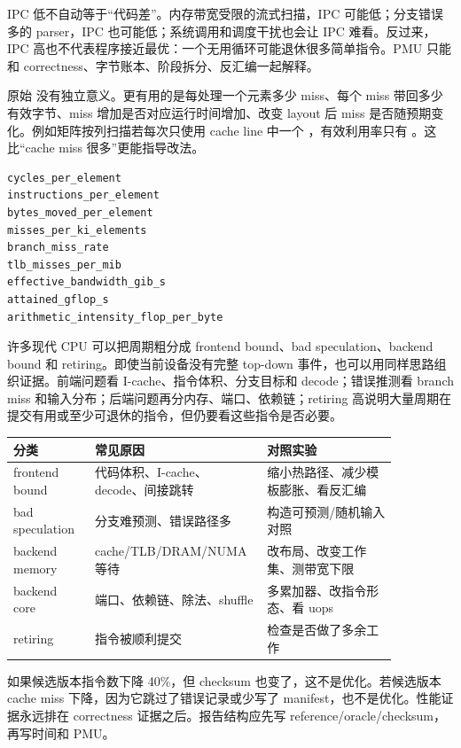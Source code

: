 IPC 低不自动等于“代码差”。内存带宽受限的流式扫描，IPC 可能低；分支错误多的 parser，IPC 也可能低；系统调用和调度干扰也会让 IPC 难看。反过来，IPC 高也不代表程序接近最优：一个无用循环可能退休很多简单指令。PMU 只能和 correctness、字节账本、阶段拆分、反汇编一起解释。

原始  没有独立意义。更有用的是每处理一个元素多少 miss、每个 miss 带回多少有效字节、miss 增加是否对应运行时间增加、改变 layout 后 miss 是否随预期变化。例如矩阵按列扫描若每次只使用 cache line 中一个 ，有效利用率只有 。这比“cache miss 很多”更能指导改法。

\begin{lstlisting}[numbers=none,caption={报告中更有解释力的派生字段}]
cycles_per_element
instructions_per_element
bytes_moved_per_element
misses_per_ki_elements
branch_miss_rate
tlb_misses_per_mib
effective_bandwidth_gib_s
attained_gflop_s
arithmetic_intensity_flop_per_byte
\end{lstlisting}

许多现代 CPU 可以把周期粗分成 frontend bound、bad speculation、backend bound 和 retiring。即使当前设备没有完整 top-down 事件，也可以用同样思路组织证据。前端问题看 I-cache、指令体积、分支目标和 decode；错误推测看 branch miss 和输入分布；后端问题再分内存、端口、依赖链；retiring 高说明大量周期在提交有用或至少可退休的指令，但仍要看这些指令是否必要。

\begin{center}
\begin{tabular}{p{0.20\linewidth}p{0.34\linewidth}p{0.32\linewidth}}
\toprule
分类 & 常见原因 & 对照实验 \\
\midrule
frontend bound & 代码体积、I-cache、decode、间接跳转 & 缩小热路径、减少模板膨胀、看反汇编 \\
bad speculation & 分支难预测、错误路径多 & 构造可预测/随机输入对照 \\
backend memory & cache/TLB/DRAM/NUMA 等待 & 改布局、改变工作集、测带宽下限 \\
backend core & 端口、依赖链、除法、shuffle & 多累加器、改指令形态、看 uops \\
retiring & 指令被顺利提交 & 检查是否做了多余工作 \\
\bottomrule
\end{tabular}
\end{center}

如果候选版本指令数下降 40\%，但 checksum 也变了，这不是优化。若候选版本 cache miss 下降，因为它跳过了错误记录或少写了 manifest，也不是优化。性能证据永远排在 correctness 证据之后。报告结构应先写 reference/oracle/checksum，再写时间和 PMU。

